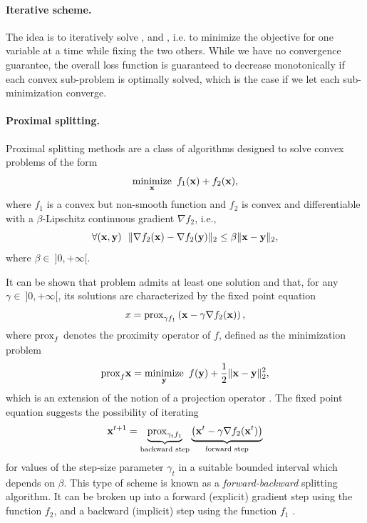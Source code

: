 \paragraph{Iterative scheme.}
The idea is to iteratively solve ,  and , i.e. to minimize the objective for one variable at a time while fixing the two others. While we have no convergence guarantee, the overall loss function is guaranteed to decrease monotonically if each convex sub-problem is optimally solved, which is the case if we let each sub-minimization converge.

\paragraph{Proximal splitting.}
Proximal splitting methods are a class of algorithms designed to solve convex problems of the form
\begin{equation} \label{eqn:convex_prob}
	\operatorname*{minimize}\limits_{\mathbf{x}} \  f_1(\mathbf{x}) + f_2(\mathbf{x}),
\end{equation}
where $f_1$ is a convex but non-smooth function and $f_2$ is convex and differentiable with a $\beta$-Lipschitz continuous gradient $\nabla f_2$, i.e.,
\begin{equation}
	\forall(\mathbf{x},\mathbf{y}) \ \ \|\nabla f_2(\mathbf{x}) - \nabla f_2(\mathbf{y}) \|_2 \leq \beta \| \mathbf{x} - \mathbf{y} \|_2 ,
\end{equation}
where $\beta \in \ ]0,+\infty[$.

It can be shown \cite{combettes2005forwardBackward} that problem  admits at least one solution and that, for any $\gamma \in \ ]0,+\infty[$, its solutions are characterized by the fixed point equation
\begin{equation} \label{eqn:fixed_point}
	x = \text{prox}_{\gamma f_1} \left( \mathbf{x} - \gamma \nabla f_2(\mathbf{x}) \right),
\end{equation}
where $\text{prox}_{f}$ denotes the proximity operator of $f$, defined as the minimization problem
\begin{equation}
	\text{prox}_{f} \mathbf{x} = \operatorname*{minimize}\limits_{\mathbf{y}} \  f(\mathbf{y}) + \frac{1}{2} \| \mathbf{x} - \mathbf{y} \|_2^2,
\end{equation}
which is an extension of the notion of a projection operator \cite{moreau1962prox}.
The fixed point equation  suggests the possibility of iterating
\begin{equation}
	\mathbf{x}^{t+1} = \underbrace{\text{prox}_{\gamma_t f_1}}_\text{backward step} \underbrace{ \left( \mathbf{x}^t - \gamma \nabla f_2(\mathbf{x}^t) \right) }_\text{forward step}
\end{equation}
for values of the step-size parameter $\gamma_t$ in a suitable bounded interval which depends on $\beta$. This type of scheme is known as a \textit{forward-backward} splitting algorithm. It can be broken up into a forward (explicit) gradient
step using the function $f_2$, and a backward (implicit) step using the function $f_1$ \cite{combettes2011proximalSplitting}.

